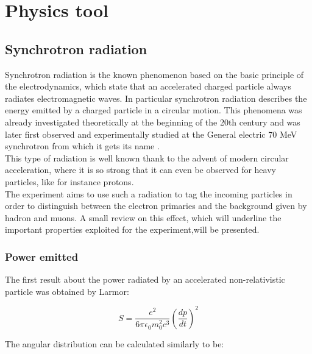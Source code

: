 
\newcommand{\appdirb}{appendices/plots/appendixB}

\chapter{Physics tool} %

\label{AppendixB} %

\section{Synchrotron radiation}
\label{appB:sec:sr}

Synchrotron radiation is the known phenomenon based on the basic principle of the electrodynamics, which state that an accelerated charged particle always radiates electromagnetic waves. In particular synchrotron radiation describes the energy emitted by a charged particle in a circular motion. This phenomena was already investigated theoretically at the beginning of the 20th century and was later first observed and experimentally studied at the General electric 70 MeV synchrotron from which it gets its name \cite{synchrotron-radiation}. \\
This type of radiation is well known thank to the advent of modern circular acceleration, where it is so strong that it can even be observed for heavy particles, like for instance protons. \\
The experiment aims to use such a radiation to tag the incoming particles in order to distinguish between the electron primaries and the background given by hadron and muons. A small review on this effect, which will underline the important properties exploited for the experiment,will be presented.


\subsection{Power emitted}
The first result about the power radiated by an accelerated non-relativistic particle was obtained by Larmor:

\begin{equation}
S = \frac{e^2}{6 \pi \epsilon_0 m_0^2 c^3}\left(\frac{dp}{dt}\right)^2
\label{eqn:radiated-power}
\end{equation}

The angular distribution can be calculated similarly to be:

